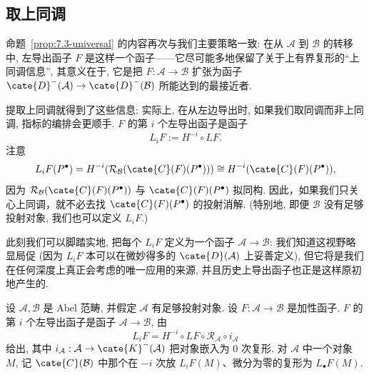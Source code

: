 \subsection{取上同调}
\label{subsec:7.3-cohomology}

命题~\ref{prop:7.3-universal} 的内容再次与我们主要策略一致: 在从 $\mathcal{A}$ 到 $\mathcal{B}$ 的转移中, 左导出函子 $F$ 是这样一个函子——它尽可能多地保留了关于上有界复形的``上同调信息'', 其意义在于, 它是把 $F:\mathcal{A}\to\mathcal{B}$ 扩张为函子 $\cate{D}^-(\mathcal{A})\to\cate{D}^-(\mathcal{B})$ 所能达到的最接近者.

提取上同调就得到了这些信息; 实际上, 在从左边导出时, 如果我们取同调而非上同调, 指标的编排会更顺手. $F$ 的第 $i$ 个左导出函子是函子
\[
L_i F := H^{-i}\circ L F.
\]
注意
\[
L_i F(P^\bullet)=H^{-i}(\mathcal{R}_{\mathcal{B}}(\cate{C}(F)(P^\bullet)))\cong H^{-i}(\cate{C}(F)(P^\bullet)),
\]
因为 $\mathcal{R}_{\mathcal{B}}(\cate{C}(F)(P^\bullet))$ 与 $\cate{C}(F)(P^\bullet)$ 拟同构. 因此，如果我们只关心上同调，就不必去找 $\cate{C}(F)(P^\bullet)$ 的投射消解. (特别地, 即便 $\mathcal{B}$ 没有足够投射对象, 我们也可以定义 $L_i F$.)

此刻我们可以脚踏实地, 把每个 $L_i F$ 定义为一个函子 $\mathcal{A}\to\mathcal{B}$: 我们知道这视野略显局促 (因为 $L_i F$ 本可以在微妙得多的 $\cate{D}(\mathcal{A})$ 上妥善定义), 但它将是我们在任何深度上真正会考虑的唯一应用的来源, 并且历史上导出函子也正是这样原初地产生的.

\begin{definition}\label{def:7.5-ith-derived}
设 $\mathcal{A},\mathcal{B}$ 是 Abel 范畴, 并假定 $\mathcal{A}$ 有足够投射对象. 设 $F:\mathcal{A}\to\mathcal{B}$ 是加性函子. $F$ 的第 $i$ 个左导出函子是函子 $\mathcal{A}\to\mathcal{B}$, 由
\[
L_i F = H^{-i}\circ L F\circ\mathcal{R}_{\mathcal{A}}\circ i_{\mathcal{A}}
\]
给出, 其中 $i_{\mathcal{A}}:\mathcal{A}\to\cate{K}^-(\mathcal{A})$ 把对象嵌入为 $0$ 次复形. 对 $\mathcal{A}$ 中一个对象 $M$, 记 $\cate{C}(\mathcal{B})$ 中那个在 $-i$ 次放 $L_i F(M)$、微分为零的复形为 $L_\bullet F(M)$.
\end{definition}

